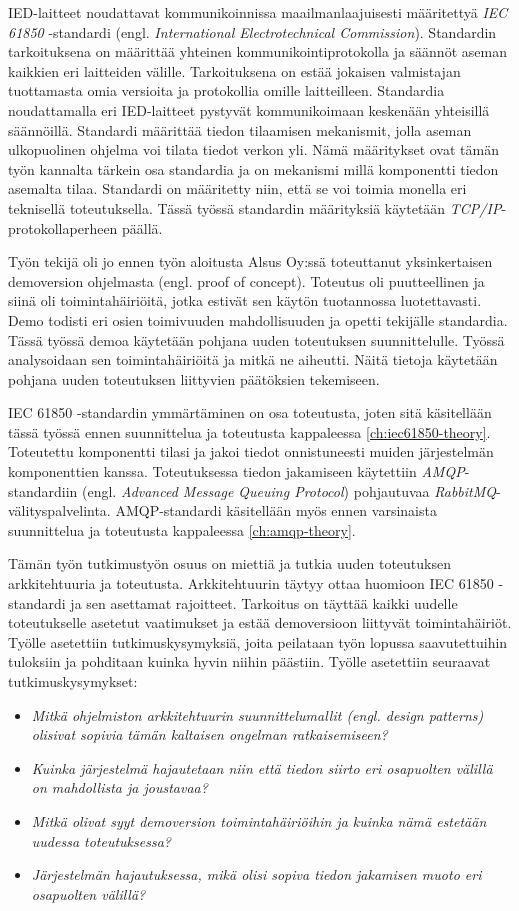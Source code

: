 IED-laitteet noudattavat kommunikoinnissa maailmanlaajuisesti määritettyä \emph{IEC 61850} -standardi (engl. \emph{International Electrotechnical Commission}). Standardin tarkoituksena on määrittää yhteinen kommunikointiprotokolla ja säännöt aseman kaikkien eri laitteiden välille. Tarkoituksena on estää jokaisen valmistajan tuottamasta omia versioita ja protokollia omille laitteilleen. Standardia noudattamalla eri IED-laitteet pystyvät kommunikoimaan keskenään yhteisillä säännöillä. Standardi määrittää tiedon tilaamisen mekanismit, jolla aseman ulkopuolinen ohjelma voi tilata tiedot verkon yli. Nämä määritykset ovat tämän työn kannalta tärkein osa standardia ja on mekanismi millä komponentti tiedon asemalta tilaa. Standardi on määritetty niin, että se voi toimia monella eri teknisellä toteutuksella. Tässä työssä standardin määrityksiä käytetään \emph{TCP/IP}-protokollaperheen päällä.

Työn tekijä oli jo ennen työn aloitusta Alsus Oy:ssä toteuttanut yksinkertaisen demoversion ohjelmasta (engl. proof of concept). Toteutus oli puutteellinen ja siinä oli toimintahäiriöitä, jotka estivät sen käytön tuotannossa luotettavasti. Demo todisti eri osien toimivuuden mahdollisuuden ja opetti tekijälle standardia. Tässä työssä demoa käytetään pohjana uuden toteutuksen suunnittelulle. Työssä analysoidaan sen toimintahäiriöitä ja mitkä ne aiheutti. Näitä tietoja käytetään pohjana uuden toteutuksen liittyvien päätöksien tekemiseen.

IEC 61850 -standardin ymmärtäminen on osa toteutusta, joten sitä käsitellään tässä työssä ennen suunnittelua ja toteutusta kappaleessa \ref{ch:iec61850-theory}. Toteutettu komponentti tilasi ja jakoi tiedot onnistuneesti muiden järjestelmän komponenttien kanssa. Toteutuksessa tiedon jakamiseen käytettiin \emph{AMQP}-standardiin (engl. \emph{Advanced Message Queuing Protocol}) pohjautuvaa \emph{RabbitMQ}-välityspalvelinta. AMQP-standardi käsitellään myös ennen varsinaista suunnittelua ja toteutusta kappaleessa \ref{ch:amqp-theory}.

Tämän työn tutkimustyön osuus on miettiä ja tutkia uuden toteutuksen arkkitehtuuria ja toteutusta. Arkkitehtuurin täytyy ottaa huomioon IEC 61850 -standardi ja sen asettamat rajoitteet. Tarkoitus on täyttää kaikki uudelle toteutukselle asetetut vaatimukset ja estää demoversioon liittyvät toimintahäiriöt. Työlle asetettiin tutkimuskysymyksiä, joita peilataan työn lopussa saavutettuihin tuloksiin ja pohditaan kuinka hyvin niihin päästiin. Työlle asetettiin seuraavat tutkimuskysymykset:
\begin{itemize}
	\item \emph{Mitkä ohjelmiston arkkitehtuurin suunnittelumallit (engl. design patterns) olisivat sopivia tämän kaltaisen ongelman ratkaisemiseen?}
	\item \emph{Kuinka järjestelmä hajautetaan niin että tiedon siirto eri osapuolten välillä on mahdollista ja joustavaa?}
	\item \emph{Mitkä olivat syyt demoversion toimintahäiriöihin ja kuinka nämä estetään uudessa toteutuksessa?}
	\item \emph{Järjestelmän hajautuksessa, mikä olisi sopiva tiedon jakamisen muoto eri osapuolten välillä?}
\end{itemize}